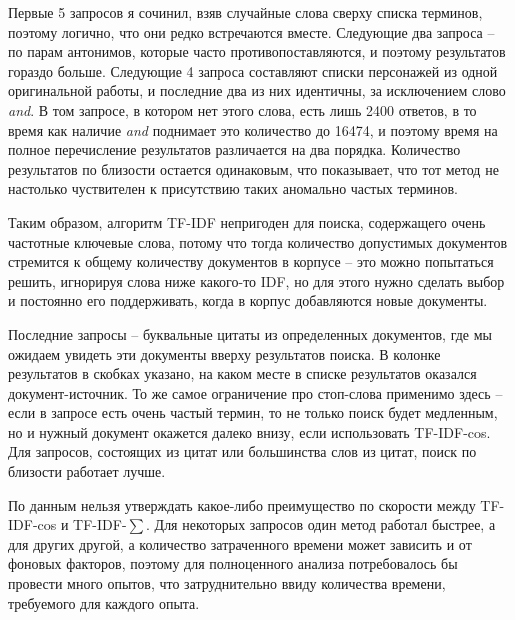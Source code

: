 \documentclass[a4page]{article}
\begin{document}
Первые 5 запросов я сочинил, взяв случайные слова сверху списка терминов, поэтому логично, что они редко встречаются вместе. Следующие два запроса -- по парам антонимов, которые часто противопоставляются, и поэтому результатов гораздо больше. Следующие 4 запроса составляют списки персонажей из одной оригинальной работы, и последние два из них идентичны, за исключением слово \textit{and}. В том запросе, в котором нет этого слова, есть лишь 2400 ответов, в то время как наличие \textit{and} поднимает это количество до 16474, и поэтому время на полное перечисление результатов различается на два порядка. Количество результатов по близости остается одинаковым, что показывает, что тот метод не настолько чуствителен к присутствию таких аномально частых терминов.

Таким образом, алгоритм TF-IDF непригоден для поиска, содержащего очень частотные ключевые слова, потому что тогда количество допустимых документов стремится к общему количеству документов в корпусе -- это можно попытаться решить, игнорируя слова ниже какого-то IDF, но для этого нужно сделать выбор и постоянно его поддерживать, когда в корпус добавляются новые документы.

Последние запросы -- буквальные цитаты из определенных документов, где мы ожидаем увидеть эти документы вверху результатов поиска. В колонке результатов в скобках указано, на каком месте в списке результатов оказался документ-источник. То же самое ограничение про стоп-слова применимо здесь -- если в запросе есть очень частый термин, то не только поиск будет медленным, но и нужный документ окажется далеко внизу, если использовать TF-IDF-cos. Для запросов, состоящих из цитат или большинства слов из цитат, поиск по близости работает лучше.

По данным нельзя утверждать какое-либо преимущество по скорости между TF-IDF-cos и TF-IDF-$\sum$. Для некоторых запросов один метод работал быстрее, а для других другой, а количество затраченного времени может зависить и от фоновых факторов, поэтому для полноценного анализа потребовалось бы провести много опытов, что затруднительно ввиду количества времени, требуемого для каждого опыта.
\end{document}
